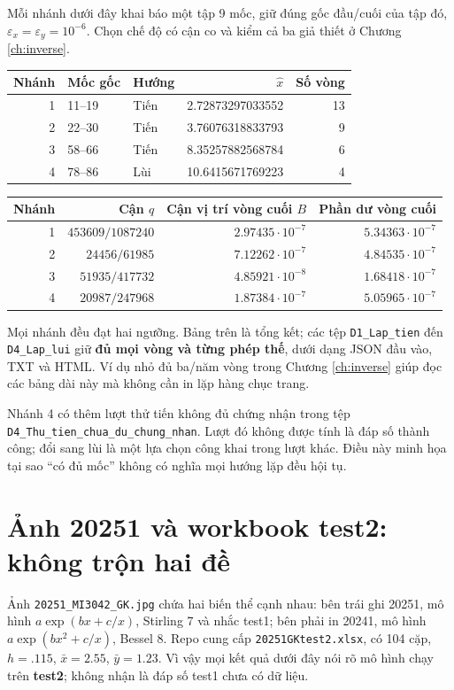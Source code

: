 Mỗi nhánh dưới đây khai báo một tập 9 mốc, giữ đúng gốc đầu/cuối của tập đó, $\varepsilon_x=\varepsilon_y=10^{-6}$. Chọn chế độ có cận co và kiểm cả ba giả thiết ở Chương \ref{ch:inverse}.
\begin{center}\small
\begin{tabular}{@{}rllrr@{}}\toprule
Nhánh&Mốc gốc&Hướng&$\widehat x$&Số vòng\\\midrule
1&11--19&Tiến&2.72873297033552&13\\
2&22--30&Tiến&3.76076318833793&9\\
3&58--66&Tiến&8.35257882568784&6\\
4&78--86&Lùi&10.6415671769223&4\\\bottomrule
\end{tabular}\end{center}
\begin{center}\small
\begin{tabular}{rrrr}\toprule
Nhánh&Cận $q$&Cận vị trí vòng cuối $B$&Phần dư vòng cuối\\\midrule
1&$453609/1087240$&$2.97435\cdot10^{-7}$&$5.34363\cdot10^{-7}$\\
2&$24456/61985$&$7.12262\cdot10^{-7}$&$4.84535\cdot10^{-7}$\\
3&$51935/417732$&$4.85921\cdot10^{-8}$&$1.68418\cdot10^{-7}$\\
4&$20987/247968$&$1.87384\cdot10^{-7}$&$5.05965\cdot10^{-7}$\\\bottomrule
\end{tabular}\end{center}
Mọi nhánh đều đạt hai ngưỡng. Bảng trên là tổng kết; các tệp \texttt{D1\_Lap\_tien} đến \texttt{D4\_Lap\_lui} giữ \textbf{đủ mọi vòng và từng phép thế}, dưới dạng JSON đầu vào, TXT và HTML. Ví dụ nhỏ đủ ba/năm vòng trong Chương \ref{ch:inverse} giúp đọc các bảng dài này mà không cần in lặp hàng chục trang.

Nhánh 4 có thêm lượt thử tiến không đủ chứng nhận trong tệp \texttt{D4\_Thu\_tien\_chua\_du\_chung\_nhan}. Lượt đó không được tính là đáp số thành công; đổi sang lùi là một lựa chọn công khai trong lượt khác. Điều này minh họa tại sao ``có đủ mốc'' không có nghĩa mọi hướng lặp đều hội tụ.

\section{Ảnh 20251 và workbook test2: không trộn hai đề}
Ảnh \texttt{20251\_MI3042\_GK.jpg} chứa hai biến thể cạnh nhau: bên trái ghi 20251, mô hình $a\exp(bx+c/x)$, Stirling 7 và nhắc test1; bên phải in 20241, mô hình $a\exp(bx^2+c/x)$, Bessel 8. Repo cung cấp \texttt{20251GKtest2.xlsx}, có 104 cặp, $h=.115$, $\bar x=2.55$, $\bar y=1.23$. Vì vậy mọi kết quả dưới đây nói rõ mô hình chạy trên \textbf{test2}; không nhận là đáp số test1 chưa có dữ liệu.

